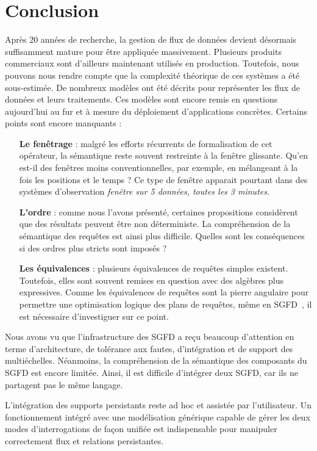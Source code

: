 \section{Conclusion}\label{sec:rw:sgfd:synthese}
Après 20 années de recherche, la gestion de flux de données devient désormais suffisamment mature pour être appliquée massivement. Plusieurs produits commerciaux sont d'ailleurs maintenant utilisés en production. Toutefois, nous pouvons nous rendre compte que la complexité théorique de ces systèmes a été sous-estimée. De nombreux modèles ont été décrits pour représenter les flux de données et leurs traitements. Ces modèles sont encore remis en questions aujourd'hui au fur et à mesure du déploiement d'applications concrètes. Certains points sont encore manquants :
\begin{itemize}
\item[\textbf{Le fenêtrage}] : malgré les efforts récurrents de formalisation de cet opérateur, la sémantique reste souvent restreinte à la fenêtre glissante. Qu'en est-il des fenêtres moins conventionnelles, par exemple, en mélangeant à la fois les positions et le temps ? Ce type de fenêtre apparait pourtant dans des systèmes d'observation \textit{fenêtre sur 5 données, toutes les 3 minutes}.
\item[\textbf{L'ordre}] : comme nous l'avons présenté, certaines propositions considèrent que des résultats peuvent être non déterministe. La compréhension de la sémantique des requêtes est ainsi plus difficile. Quelles sont les conséquences si des ordres plus stricts sont imposés ?
\item[\textbf{Les équivalences}] : plusieurs équivalences de requêtes simples existent. Toutefois, elles sont souvent remises en question avec des algèbres plus expressives. Comme les équivalences de requêtes sont la pierre angulaire pour permettre une optimisation logique des plans de requêtes, même en SGFD~\cite{Slivinskas:temporal,Arasu:stream}, il est nécessaire d'investiguer sur ce point.
\end{itemize}

Nous avons vu que l'infrastructure des SGFD a reçu beaucoup d'attention en terme d'architecture, de tolérance aux fautes, d'intégration et de support des multiéchelles. Néanmoins, la compréhension de la sémantique des composants du SGFD est encore limitée. Ainsi, il est difficile d'intégrer deux SGFD, car ils ne partagent pas le même langage.

L'intégration des supports persistants reste ad hoc et assistée par l'utilisateur. Un fonctionnement intégré avec une modélisation générique capable de gérer les deux modes d'interrogations de façon unifiée est indispensable pour manipuler correctement flux et relations persistantes.

